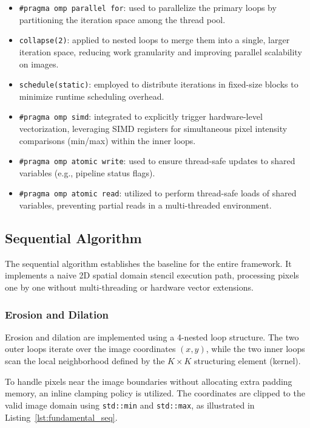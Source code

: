 \documentclass[10pt,twocolumn,letterpaper]{article}
\begin{document}
\begin{itemize}
    \item \texttt{\#pragma omp parallel for}: used to parallelize the primary loops by partitioning the iteration space among the thread pool.
    \item \texttt{collapse(2)}: applied to nested loops to merge them into a single, larger iteration space, reducing work granularity and improving parallel scalability on images.
    \item \texttt{schedule(static)}: employed to distribute iterations in fixed-size blocks to minimize runtime scheduling overhead.
    \item \texttt{\#pragma omp simd}: integrated to explicitly trigger hardware-level vectorization, leveraging SIMD registers for simultaneous pixel intensity comparisons (min/max) within the inner loops.
    \item \texttt{\#pragma omp atomic write}: used to ensure thread-safe updates to shared variables (e.g., pipeline status flags).
    \item \texttt{\#pragma omp atomic read}: utilized to perform thread-safe loads of shared variables, preventing partial reads in a multi-threaded environment.
\end{itemize}

\subsection{Sequential Algorithm}
\label{subsec:sequential}

The sequential algorithm establishes the baseline for the entire framework. It implements a naive 2D spatial domain stencil execution path, processing pixels one by one without multi-threading or hardware vector extensions.

\subsubsection{Erosion and Dilation}
Erosion and dilation are implemented using a 4-nested loop structure. The two outer loops iterate over the image coordinates $(x, y)$, while the two inner loops scan the local neighborhood defined by the $K \times K$ structuring element (kernel).

To handle pixels near the image boundaries without allocating extra padding memory, an inline clamping policy is utilized. The coordinates are clipped to the valid image domain using \lstinline|std::min| and \lstinline|std::max|, as illustrated in Listing~\ref{lst:fundamental_seq}.
\end{document}
